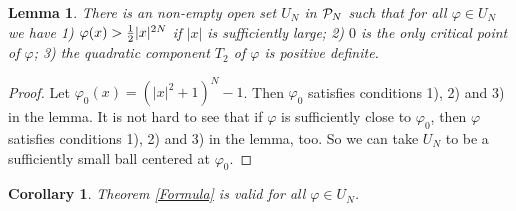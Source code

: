 \documentclass{article}
\newtheorem{Lem}[defn]{Lemma}
\newtheorem{Cor}[defn]{Corollary}
\newtheorem{main theorem}[defn]{Main Theorem}
\begin{document}
\begin{Lem}\label{key}
There is an non-empty open set $U_N$ in ${\cal P}_N$ such that for
all $\varphi\in U_N$ we have 1) $\varphi(x)>{1\over 2}|x|^{2N}$ if
$|x|$ is sufficiently large; 2) $0$ is the only critical point of
$\varphi$; 3) the quadratic component $T_2$ of $\varphi$ is
positive definite.
\end{Lem}
\begin{proof} Let $\varphi_0(x)=(|x|^2+1)^N-1$. Then $\varphi_0$
satisfies conditions 1), 2) and 3) in the lemma. It is not hard to
see that if $\varphi$ is sufficiently close to $\varphi_0$, then
$\varphi$ satisfies conditions 1), 2) and 3) in the lemma, too. So
we can take $U_N$ to be a sufficiently small ball centered at
$\varphi_0$.
\end{proof}
\begin{Cor}
Theorem \ref{Formula} is valid for all $\varphi\in U_N$.
\end{Cor}
\end{document}
